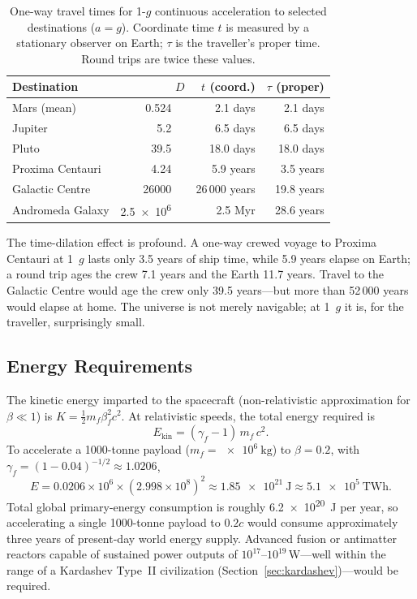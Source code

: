 \documentclass[12pt,a4paper]{article}
\newcommand{\AU}{\,\text{AU}}
\newcommand{\ly}{\,\text{ly}}
\newcommand{\half}{\tfrac{1}{2}}
\begin{document}
\begin{table}[ht]
  \centering
  \caption{One-way travel times for 1-$g$ continuous acceleration to selected
   destinations ($a=g$). Coordinate time $t$ is measured by a stationary
   observer on Earth; $\tau$ is the traveller's proper time. Round trips are
   twice these values.}
  \label{tab:rel_trips}
  \begin{tabularx}{\textwidth}{X r r r}
    \toprule
    Destination & $D$ & $t$ (coord.) & $\tau$ (proper) \\
    \midrule
    Mars (mean)           & \SI{0.524}{\AU} & 2.1 days      & 2.1 days       \\
    Jupiter               & \SI{5.2}{\AU}   & 6.5 days      & 6.5 days       \\
    Pluto                 & \SI{39.5}{\AU}  & 18.0 days     & 18.0 days      \\
    Proxima Centauri      & \SI{4.24}{\ly}  & 5.9 years     & 3.5 years      \\
    Galactic Centre       & \SI{26000}{\ly} & 26\,000 years & 19.8 years     \\
    Andromeda Galaxy      & \SI{2.5e6}{\ly} & 2.5 Myr       & 28.6 years     \\
    \bottomrule
  \end{tabularx}
\end{table}

The time-dilation effect is profound. A one-way crewed voyage to Proxima
Centauri at 1~$g$ lasts only 3.5 years of ship time, while 5.9 years elapse on
Earth; a round trip ages the crew 7.1 years and the Earth 11.7 years. Travel to
the Galactic Centre would age the crew only 39.5 years---but more than 52\,000
years would elapse at home. The universe is not merely navigable; at 1~$g$ it
is, for the traveller, surprisingly small.

\subsection{Energy Requirements}

The kinetic energy imparted to the spacecraft (non-relativistic approximation
for $\beta \ll 1$) is $K = \half m_f \beta_f^2 c^2$. At relativistic
speeds, the total energy required is
\begin{equation}
  E_{\mathrm{kin}} = (\gamma_f - 1)\,m_f\,c^2.
  \label{eq:kinetic_rel}
\end{equation}
To accelerate a 1000-tonne payload ($m_f = \SI{e6}{\kilo\gram}$) to
$\beta = 0.2$, with $\gamma_f = (1-0.04)^{-1/2} \approx 1.0206$,
\begin{equation*}
  E = 0.0206 \times 10^6 \times (2.998\times10^{8})^2
    \approx \SI{1.85e21}{\joule}
    \approx \SI{5.1e5}{\tera\watt\hour}.
\end{equation*}
Total global primary-energy consumption is roughly \SI{6.2e20}{\joule} per
year, so accelerating a single 1000-tonne payload to $0.2c$ would consume
approximately three years of present-day world energy supply. Advanced fusion
or antimatter reactors capable of sustained power outputs of
$10^{17}$--$10^{19}$\,W---well within the range of a Kardashev Type~II
civilization (Section~\ref{sec:kardashev})---would be required.
\end{document}

